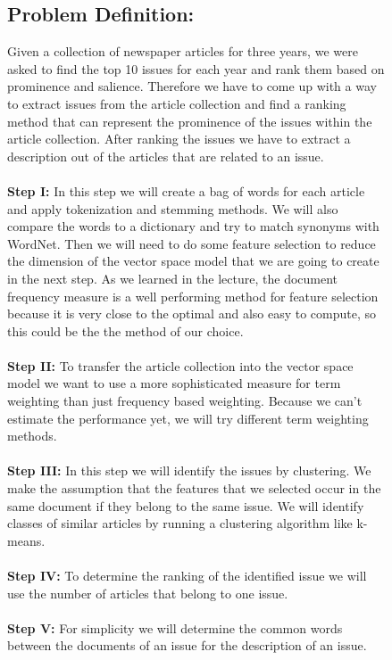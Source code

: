\documentclass{article}
\begin{document}
\begin{figure}[h]
\begin{minipage}[c]{\textwidth-4cm}
\subsection{Problem Definition:} Given a collection of newspaper articles for three years, we were asked to find the top 10 issues for each year and rank them based on prominence and salience. Therefore we have to come up with a way to extract issues from the article collection and find a ranking method that can represent the prominence of the issues within the article collection.
After ranking the issues we have to extract a description out of the articles that are related to an issue.\\
\\
\textbf{Step I:} 
In this step we will create a bag of words for each article and apply tokenization and stemming methods. We will also compare the words to a dictionary and try to match synonyms with WordNet.
Then we will need to do some feature selection to reduce the dimension of the vector space model that we are going to create in the next step.
As we learned in the lecture, the document frequency measure is a well performing method for feature selection because it is very close to the optimal and also easy to compute, so this could be the the method of our choice.\\
\\
\textbf{Step II:} To transfer the article collection into the vector space model we want to use a more sophisticated measure for term weighting than just frequency based weighting. Because we can't estimate the performance yet, we will try different term weighting methods.\\
\\
\textbf{Step III:} In this step we will identify the issues by clustering. We make the assumption that the features that we selected occur in the same document if they belong to the same issue. We will identify classes of similar articles by running a clustering algorithm like k-means.\\
\\
\textbf{Step IV:} To determine the ranking of the identified issue we will use the number of articles that belong to one issue.\\
\\
\textbf{Step V:} For simplicity we will determine the common words between the documents of an issue for the description of an issue.

\end{minipage}

\end{figure}
\end{document}

